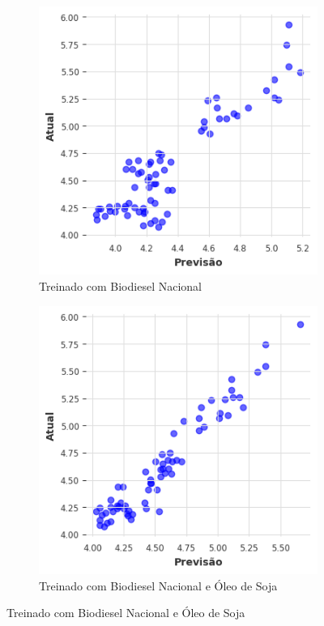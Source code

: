 \begin{figure}[htbp]
	\centering
	\begin{subfigure}[b]{0.40\textwidth}
		\centering
		\includegraphics[width=\textwidth]{figuras/narx_brasil_scatter.png} %
		\caption{Treinado com Biodiesel Nacional \newline}
		\label{fig:narx_brasil_scatter}
	\end{subfigure}
	\hfill
	\begin{subfigure}[b]{0.40\textwidth}
		\centering
		\includegraphics[width=\textwidth]{figuras/narx_brasil_oil_scatter.png} %
		\caption{Treinado com Biodiesel Nacional e Óleo de Soja}
		\label{fig:narx_brasil_oil_scatter}
	\end{subfigure}


\end{figure}
